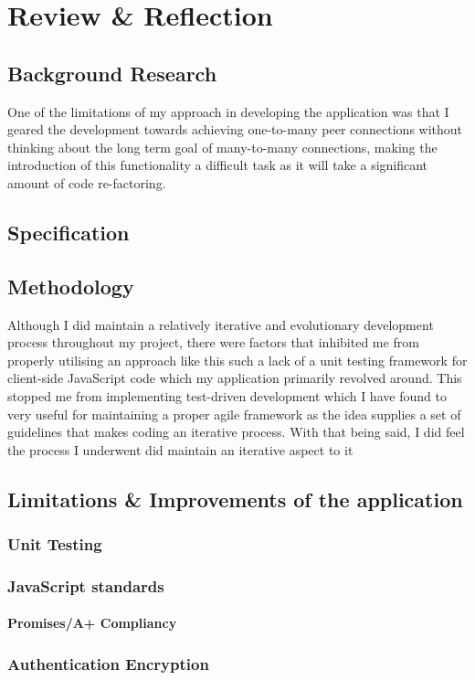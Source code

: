 \documentclass[]{report}
\begin{document}
	\chapter{Review \& Reflection}	
		\section{Background Research}
		One of the limitations of my approach in developing the application was that I geared the development towards achieving one-to-many peer connections without thinking about the long term goal of many-to-many connections, making the introduction of this functionality a difficult task as it will take a significant amount of code re-factoring.
		\section{Specification}
		\section{Methodology}
		Although I did maintain a relatively iterative and evolutionary development process throughout my project, there were factors that inhibited me from properly utilising an approach like this such a lack of a unit testing framework for client-side JavaScript code which my application primarily revolved around. This stopped me from implementing test-driven development which I have found to very useful for maintaining a proper agile framework as the idea supplies a set of guidelines that makes coding an iterative process. With that being said, I did feel the process I underwent did maintain an iterative aspect to it 
	
		\section{Limitations \& Improvements of the application}
			\subsection{Unit Testing}
			\subsection{JavaScript standards}
				\subsubsection{Promises/A+ Compliancy}
			\subsection{Authentication Encryption}
\end{document}

